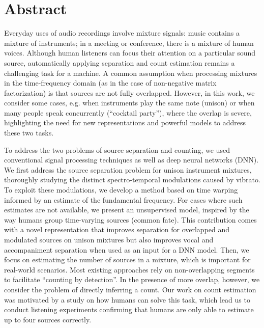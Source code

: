 \begingroup
\let\clearpage\relax
\let\cleardoublepage\relax
\let\cleardoublepage\relax

\chapter*{Abstract}
Everyday uses of audio recordings involve mixture signals: music contains a mixture of instruments; in a meeting or conference, there is a mixture of human voices.
Although human listeners can focus their attention on a particular sound source, automatically applying separation and count estimation remains a challenging task for a machine.
A common assumption when processing mixtures in the time-frequency domain (as in the case of non-negative matrix factorization) is that sources are not fully overlapped.
However, in this work, we consider some cases, e.g. when instruments play the same note (unison) or when many people speak concurrently (``cocktail party''), where the overlap is severe, highlighting the need for new representations and powerful models to address these two tasks.
\par
To address the two problems of source separation and counting, we used conventional signal processing techniques as well as deep neural networks (DNN).
We first address the source separation problem for unison instrument mixtures, thoroughly studying the distinct spectro-temporal modulations caused by vibrato.
To exploit these modulations, we develop a method based on time warping informed by an estimate of the fundamental frequency.
For cases where such estimates are not available, we present an unsupervised model, inspired by the way humans group time-varying sources (common fate).
This contribution comes with a novel representation that improves separation for overlapped and modulated sources on unison mixtures but also improves vocal and accompaniment separation when used as an input for a DNN model.
Then, we focus on estimating the number of sources in a mixture, which is important for real-world scenarios.
Most existing approaches rely on non-overlapping segments to facilitate ``counting by detection''.
In the presence of more overlap, however, we consider the problem of directly inferring a count.
Our work on count estimation was motivated by a study on how humans can solve this task, which lead us to conduct listening experiments confirming that humans are only able to estimate up to four sources correctly.
